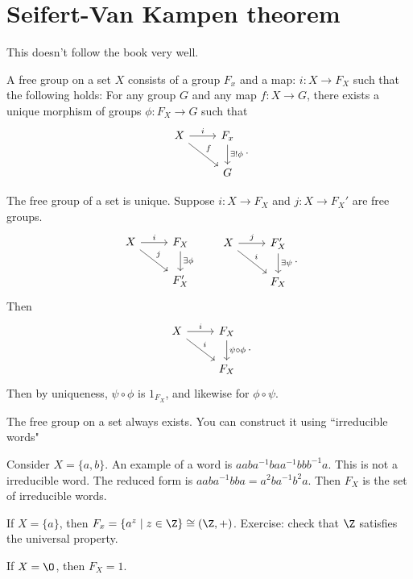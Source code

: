 
\setcounter{chapter}{10}
\chapter{Seifert-Van Kampen theorem}
\begin{note}
    This doesn't follow the book very well.
\end{note}


\begin{definition}
    A free group on a set $X$ consists of a group $F_x$ and a map: $i: X \to F_X$ such that the following holds:
For any group $G$ and any map $f: X \to G$, there exists a unique morphism of groups $\phi: F_X \to G$ such that 
\[
\begin{tikzcd}
    X \arrow[r, "i"] \arrow[dr, "f"] & F_x \arrow[d, "\exists !\phi"]\\
                                     & G
\end{tikzcd}
.\] 
    
\end{definition}
\begin{note}
    The free group of a set is unique.
    Suppose $i: X \to  F_X$ and $j : X \to  F_X'$ are free groups.
    \[
    \begin{tikzcd}
        X \arrow[r, "i"] \arrow[dr, "j"]& F_X \arrow[d, "\exists \phi"]\\
                                        & F_X'
    \end{tikzcd}
    \qquad
    \begin{tikzcd}
        X \arrow[r, "j"] \arrow[dr, "i"]& F_X' \arrow[d, "\exists \psi"]\\
                                        & F_X
    \end{tikzcd}
    .\] 
    Then 
    \[
    \begin{tikzcd}
        X \arrow[r, "i"] \arrow[dr, "i"]& F_X \arrow[d, "\psi  \circ  \phi"]\\
        &F_X
    \end{tikzcd}
    .\] 
    Then by uniqueness, $\psi  \circ  \phi$ is $1_{F_X}$, and likewise for $\phi  \circ  \psi$.
\end{note}
\begin{note}
    The free group on a set always exists. You can construct it using ``irreducible words"
\end{note}
\begin{eg}
    Consider $X = \{a, b\}$.
    An example of a word is $a a b a^{-1} b a a^{-1} b b b^{-1} a$.
    This is not a irreducible word. The reduced form is $a a b a^{-1} b b a = a^2 b a^{-1} b^2 a$.
    Then $F_X$ is the set of irreducible words.
\end{eg}
\begin{eg}
    If $X = \{a\}$, then $F_x = \{a^{z}  \mid z \in \Z\} \cong (\Z, +)$.
    Exercise: check that $\Z$ satisfies the universal property.
\end{eg}
\begin{eg}
    If $X = \O$, then  $F_X = 1$.
\end{eg}

